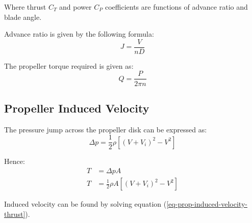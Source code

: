 Where thrust $C_T$ and power $C_P$ coefficients are functions of advance ratio and blade angle.

Advance ratio is given by the following formula: \cite{Allerton2009, Raymer1992, Torenbeek1982}
\begin{equation}
  J = \frac{V}{nD}
\end{equation}

The propeller torque required is given as: \cite{ResnickHalliday2011}
\begin{equation}
  Q = \frac{P}{2 \pi n}
\end{equation}

\subsection{Propeller Induced Velocity}

The pressure jump across the propeller disk can be expressed as:
\begin{equation}
  \Delta p = \frac{1}{2} \rho \left[ \left( V + V_i \right)^2 - V^2 \right]
\end{equation}

Hence:
\begin{align}
  T &= \Delta p A \\
  \label{eq-prop-induced-velocity-thrust}
  T &= \frac{1}{2} \rho A \left[ \left( V + V_i \right)^2 - V^2 \right]
\end{align}

Induced velocity can be found by solving equation (\ref{eq-prop-induced-velocity-thrust}).





